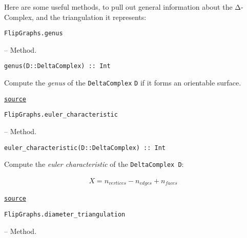 \label{8213426381003079380}{}


Here are some useful methods, to pull out general information about the Δ-Complex, and the triangulation it represents:


\hypertarget{2459276078495976634}{\texttt{FlipGraphs.genus}}  -- {Method.}

\begin{adjustwidth}{2em}{0pt}


\begin{verbatim}
genus(D::DeltaComplex) :: Int
\end{verbatim}

Compute the \emph{genus} of the \texttt{DeltaComplex} \texttt{D} if it forms an orientable surface.



\href{https://github.com/schto223/FlipGraphs.jl/blob/e35d43698a06b86273148826b79d585ba04fcd26/src/deltaComplex.jl#L380-L384}{\texttt{source}}


\end{adjustwidth}
\hypertarget{7011472771353721906}{\texttt{FlipGraphs.euler\_characteristic}}  -- {Method.}

\begin{adjustwidth}{2em}{0pt}


\begin{verbatim}
euler_characteristic(D::DeltaComplex) :: Int
\end{verbatim}

Compute the \emph{euler characteristic} of the \texttt{DeltaComplex D}:

\begin{equation*}
\begin{split}X = n_{vertices} - n_{edges} + n_{faces} \end{split}\end{equation*}


\href{https://github.com/schto223/FlipGraphs.jl/blob/e35d43698a06b86273148826b79d585ba04fcd26/src/deltaComplex.jl#L368-L376}{\texttt{source}}


\end{adjustwidth}
\hypertarget{16918497129552259148}{\texttt{FlipGraphs.diameter\_triangulation}}  -- {Method.}

